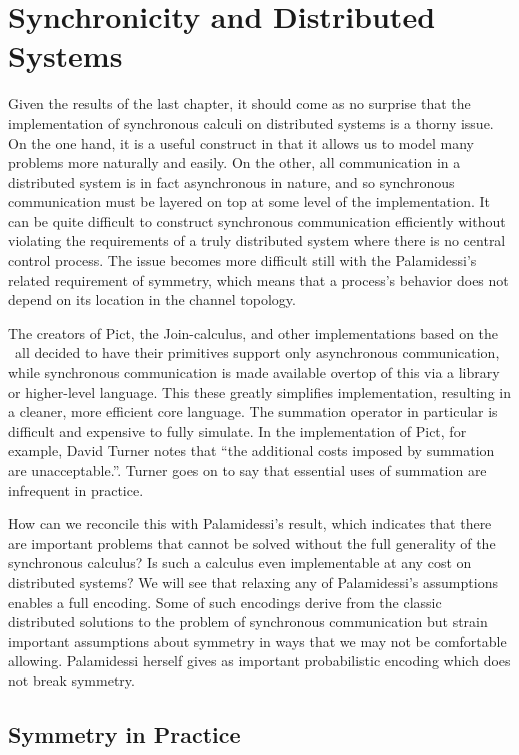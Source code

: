 \chapter{Synchronicity and Distributed Systems}\label{sync_and_dist_sys}
Given the results of the last chapter, it should come as no surprise that the implementation of synchronous calculi on distributed systems is a thorny issue.  
On the one hand, it is a useful construct in that it allows us to model many problems more naturally and easily.  
On the other, all communication in a distributed system is in fact asynchronous in nature, and so synchronous communication must be layered on top at some level of the implementation.  
It can be quite difficult to construct synchronous communication efficiently without violating the requirements of a truly distributed system where there is no central control process.  
The issue becomes more difficult still with the Palamidessi's related requirement of symmetry, which means that a process's behavior does not depend on its location in the channel topology. 

The creators of Pict, the Join-calculus, and other implementations based on the \picalc\ all decided to have their primitives support only asynchronous communication, while synchronous communication is made available overtop of this via a library or higher-level language.  
This these greatly simplifies implementation, resulting in a cleaner, more efficient core language.  
The summation operator in particular is difficult and expensive to fully simulate.  
In the implementation of Pict, for example, David Turner notes \cite{turner96} that ``the additional costs imposed by summation are unacceptable.''.  
Turner goes on to say that essential uses of summation are infrequent in practice.

How can we reconcile this with Palamidessi's result, which indicates that there are important problems that cannot be solved without the full generality of the synchronous calculus?  Is such a calculus even implementable at any cost on distributed systems?  We will see that relaxing any of Palamidessi's assumptions enables a full encoding.  
Some of such encodings derive from the classic distributed solutions to the problem of synchronous communication but strain important assumptions about symmetry in ways that we may not be comfortable allowing.  
Palamidessi herself gives as important probabilistic encoding \cite{palam01} which does not break symmetry.

\section{Symmetry in Practice}

